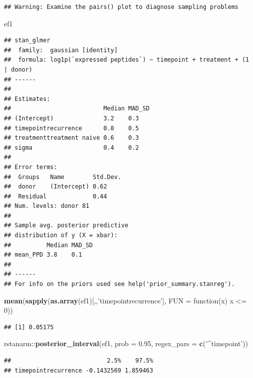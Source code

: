 \documentclass[]{article}
\newenvironment{Shaded}{\begin{snugshade}}{\end{snugshade}}
\newcommand{\KeywordTok}[1]{\textcolor[rgb]{0.13,0.29,0.53}{\textbf{{#1}}}}
\newcommand{\DataTypeTok}[1]{\textcolor[rgb]{0.13,0.29,0.53}{{#1}}}
\newcommand{\DecValTok}[1]{\textcolor[rgb]{0.00,0.00,0.81}{{#1}}}
\newcommand{\FloatTok}[1]{\textcolor[rgb]{0.00,0.00,0.81}{{#1}}}
\newcommand{\StringTok}[1]{\textcolor[rgb]{0.31,0.60,0.02}{{#1}}}
\newcommand{\NormalTok}[1]{{#1}}
\begin{document}
\begin{verbatim}
## Warning: Examine the pairs() plot to diagnose sampling problems
\end{verbatim}

\begin{Shaded}
\begin{Highlighting}[]
\NormalTok{ef1}
\end{Highlighting}
\end{Shaded}

\begin{verbatim}
## stan_glmer
##  family:  gaussian [identity]
##  formula: log1p(`expressed peptides`) ~ timepoint + treatment + (1 | donor)
## ------
## 
## Estimates:
##                          Median MAD_SD
## (Intercept)              3.2    0.3   
## timepointrecurrence      0.8    0.5   
## treatmenttreatment naive 0.6    0.3   
## sigma                    0.4    0.2   
## 
## Error terms:
##  Groups   Name        Std.Dev.
##  donor    (Intercept) 0.62    
##  Residual             0.44    
## Num. levels: donor 81 
## 
## Sample avg. posterior predictive 
## distribution of y (X = xbar):
##          Median MAD_SD
## mean_PPD 3.8    0.1   
## 
## ------
## For info on the priors used see help('prior_summary.stanreg').
\end{verbatim}

\begin{Shaded}
\begin{Highlighting}[]
\KeywordTok{mean}\NormalTok{(}\KeywordTok{sapply}\NormalTok{(}\KeywordTok{as.array}\NormalTok{(ef1)[,,}\StringTok{'timepointrecurrence'}\NormalTok{], }\DataTypeTok{FUN =} \NormalTok{function(x) x <=}\StringTok{ }\DecValTok{0}\NormalTok{))}
\end{Highlighting}
\end{Shaded}

\begin{verbatim}
## [1] 0.05175
\end{verbatim}

\begin{Shaded}
\begin{Highlighting}[]
\NormalTok{rstanarm::}\KeywordTok{posterior_interval}\NormalTok{(ef1, }\DataTypeTok{prob =} \FloatTok{0.95}\NormalTok{, }\DataTypeTok{regex_pars =} \KeywordTok{c}\NormalTok{(}\StringTok{'^timepoint'}\NormalTok{))}
\end{Highlighting}
\end{Shaded}

\begin{verbatim}
##                           2.5%    97.5%
## timepointrecurrence -0.1432569 1.859463
\end{verbatim}
\end{document}
